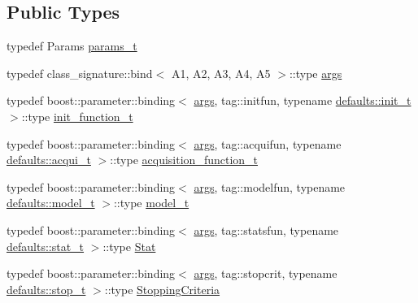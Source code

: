 \subsection*{Public Types}
\begin{DoxyCompactItemize}
\item 
typedef Params \hyperlink{classlimbo_1_1bayes__opt_1_1_bo_base_a3fb955ab00c385f5deb56f3d18211d3d}{params\+\_\+t}
\item 
typedef class\+\_\+signature\+::bind$<$ A1, A2, A3, A4, A5 $>$\+::type \hyperlink{classlimbo_1_1bayes__opt_1_1_bo_base_a75c1ae9e7268016c6f767c56bcede7d2}{args}
\item 
typedef boost\+::parameter\+::binding$<$ \hyperlink{classlimbo_1_1bayes__opt_1_1_bo_base_a75c1ae9e7268016c6f767c56bcede7d2}{args}, tag\+::initfun, typename \hyperlink{structlimbo_1_1bayes__opt_1_1_bo_base_1_1defaults_acbba74470eccef31c3f2518a3c57200c}{defaults\+::init\+\_\+t} $>$\+::type \hyperlink{classlimbo_1_1bayes__opt_1_1_bo_base_aa4cf2b36051de6b46e75621f0b9ed642}{init\+\_\+function\+\_\+t}
\item 
typedef boost\+::parameter\+::binding$<$ \hyperlink{classlimbo_1_1bayes__opt_1_1_bo_base_a75c1ae9e7268016c6f767c56bcede7d2}{args}, tag\+::acquifun, typename \hyperlink{structlimbo_1_1bayes__opt_1_1_bo_base_1_1defaults_a4ba658f2746db27c5f3abdb24d2a2f85}{defaults\+::acqui\+\_\+t} $>$\+::type \hyperlink{classlimbo_1_1bayes__opt_1_1_bo_base_a02b14991b62e0f8c9bcf834220ed62e4}{acquisition\+\_\+function\+\_\+t}
\item 
typedef boost\+::parameter\+::binding$<$ \hyperlink{classlimbo_1_1bayes__opt_1_1_bo_base_a75c1ae9e7268016c6f767c56bcede7d2}{args}, tag\+::modelfun, typename \hyperlink{structlimbo_1_1bayes__opt_1_1_bo_base_1_1defaults_a6f8da6a743f6a87096f8e0b9d4411503}{defaults\+::model\+\_\+t} $>$\+::type \hyperlink{classlimbo_1_1bayes__opt_1_1_bo_base_a1ddc93cc023a2d7d527deb4cc750624e}{model\+\_\+t}
\item 
typedef boost\+::parameter\+::binding$<$ \hyperlink{classlimbo_1_1bayes__opt_1_1_bo_base_a75c1ae9e7268016c6f767c56bcede7d2}{args}, tag\+::statsfun, typename \hyperlink{structlimbo_1_1bayes__opt_1_1_bo_base_1_1defaults_a70f64f21a85e2fa25063709abd5a2467}{defaults\+::stat\+\_\+t} $>$\+::type \hyperlink{classlimbo_1_1bayes__opt_1_1_bo_base_a0da8155a1a5be0999e112655ec3d610e}{Stat}
\item 
typedef boost\+::parameter\+::binding$<$ \hyperlink{classlimbo_1_1bayes__opt_1_1_bo_base_a75c1ae9e7268016c6f767c56bcede7d2}{args}, tag\+::stopcrit, typename \hyperlink{structlimbo_1_1bayes__opt_1_1_bo_base_1_1defaults_a3cb5d1c8866494a7a641e6f3b4367d75}{defaults\+::stop\+\_\+t} $>$\+::type \hyperlink{classlimbo_1_1bayes__opt_1_1_bo_base_ac9ab3f37c746dcf70ef7096a89dd1b6c}{Stopping\+Criteria}

\end{DoxyCompactItemize}
